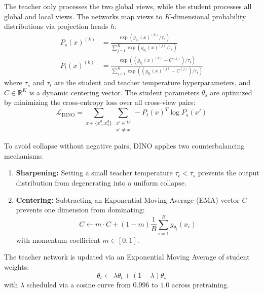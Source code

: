 \documentclass[11pt,a4paper]{article}
\begin{document}
The teacher only processes the two global views, while the student processes all global and local views. The networks map views to $K$-dimensional probability distributions via projection heads $h$:
\begin{align}
P_s(x)^{(k)} &= \frac{\exp(g_{\theta_s}(x)^{(k)} / \tau_s)}{\sum_{j=1}^K \exp(g_{\theta_s}(x)^{(j)} / \tau_s)} \label{eq:student_prob} \\
P_t(x)^{(k)} &= \frac{\exp((g_{\theta_t}(x)^{(k)} - C^{(k)}) / \tau_t)}{\sum_{j=1}^K \exp((g_{\theta_t}(x)^{(j)} - C^{(j)}) / \tau_t)} \label{eq:teacher_prob}
\end{align}
where $\tau_s$ and $\tau_t$ are the student and teacher temperature hyperparameters, and $C \in \mathbb{R}^K$ is a dynamic centering vector. The student parameters $\theta_s$ are optimized by minimizing the cross-entropy loss over all cross-view pairs:
\begin{equation}
\mathcal{L}_{\text{DINO}} = \sum_{x \in \{x_1^g, x_2^g\}} \sum_{\substack{x' \in V \\ x' \neq x}} - P_t(x)^T \log P_s(x')
\label{eq:dino_loss}
\end{equation}

To avoid collapse without negative pairs, DINO applies two counterbalancing mechanisms:
\begin{enumerate}[leftmargin=*]
    \item \textbf{Sharpening:} Setting a small teacher temperature $\tau_t < \tau_s$ prevents the output distribution from degenerating into a uniform collapse.
    \item \textbf{Centering:} Subtracting an Exponential Moving Average (EMA) vector $C$ prevents one dimension from dominating:
    \begin{equation}
    C \leftarrow m \cdot C + (1 - m) \frac{1}{B} \sum_{i=1}^B g_{\theta_t}(x_i)
    \label{eq:center_update}
    \end{equation}
    with momentum coefficient $m \in [0, 1]$.
\end{enumerate}
The teacher network is updated via an Exponential Moving Average of student weights:
\begin{equation}
\theta_t \leftarrow \lambda \theta_t + (1 - \lambda) \theta_s
\label{eq:teacher_ema}
\end{equation}
with $\lambda$ scheduled via a cosine curve from $0.996$ to $1.0$ across pretraining.
\end{document}

